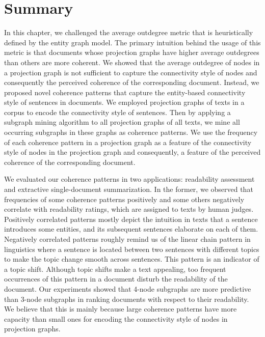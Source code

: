 \section{Summary}
\label{sec:summary}

In this chapter, we challenged the average outdegree metric that is heuristically defined by the entity graph model. 
The primary intuition behind the usage of this metric is that documents whose projection graphs have higher average outdegrees than others are more coherent. 
We showed that the average outdegree of nodes in a projection graph is not sufficient to capture the connectivity style of nodes and consequently the perceived coherence of the corresponding document. 
Instead, we proposed novel coherence patterns that capture the entity-based connectivity style of sentences in documents. 
We employed projection graphs of texts in a corpus to encode the connectivity style of sentences.  
Then by applying a subgraph mining algorithm to all projection graphs of all texts, we mine all occurring subgraphs in these graphs as coherence patterns. 
We use the frequency of each coherence pattern in a projection graph as a  feature of the connectivity style of nodes in the projection graph and consequently, a feature of the perceived coherence of the corresponding document. 

We evaluated our coherence patterns in two applications: readability assessment and extractive \mbox{single-document} summarization. 
In the former, we observed that frequencies of some coherence patterns positively and some others negatively correlate with readability ratings, which are assigned to texts by human judges. 
Positively correlated patterns mostly depict the intuition in texts that a sentence introduces some entities, and its subsequent sentences elaborate on each of them.  
Negatively correlated patterns roughly remind us of the linear chain pattern in linguistics where a sentence is located between two sentences with different topics to make the topic change smooth across sentences. 
This pattern is an indicator of a topic shift.  
Although topic shifts make a text appealing, too frequent occurrences of this pattern in a document disturb the readability of the document. 
Our experiments showed that 4-node subgraphs are more predictive than 3-node subgraphs in ranking documents with respect to their readability. 
We believe that this is mainly because large coherence patterns have more capacity than small ones for encoding the connectivity style of nodes in projection graphs. 

